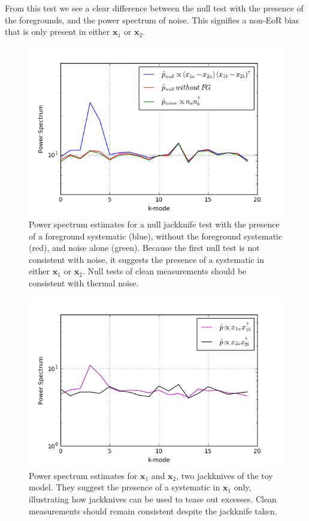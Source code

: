 \documentclass[preprint2,numberedappendix,tighten]{aastex6}  %
\begin{document}
From this test we see a clear difference between the null test with the presence of the foregrounds, and the power spectrum of noise. This signifies a non-EoR bias that is only present in either $\textbf{x}_{1}$ or $\textbf{x}_{2}$.

\begin{figure}
	\centering
	\includegraphics[trim={0.3cm 0.3cm 0.3cm 0.3cm},width=\columnwidth]{plots/toy_bias1.png}
	\caption{Power spectrum estimates for a null jackknife test with the presence of a foreground systematic (blue), without the foreground systematic (red), and noise alone (green). Because the first null test is not consistent with noise, it suggests the presence of a systematic in either $\textbf{x}_{1}$ or $\textbf{x}_{2}$. Null tests of clean measurements should be consistent with thermal noise.}
	\label{fig:toy_bias1}
\end{figure}

\begin{figure}
	\centering
	\includegraphics[trim={0.3cm 0.3cm 0.3cm 0.3cm},width=\columnwidth]{plots/toy_bias2.png}
	\caption{Power spectrum estimates for $\textbf{x}_{1}$ and $\textbf{x}_{2}$, two jackknives of the toy model. They suggest the presence of a systematic in $\textbf{x}_{1}$ only, illustrating how jackknives can be used to tease out excesses. Clean measurements should remain consistent despite the jackknife taken.}
	\label{fig:toy_bias2}
\end{figure}
\end{document}
